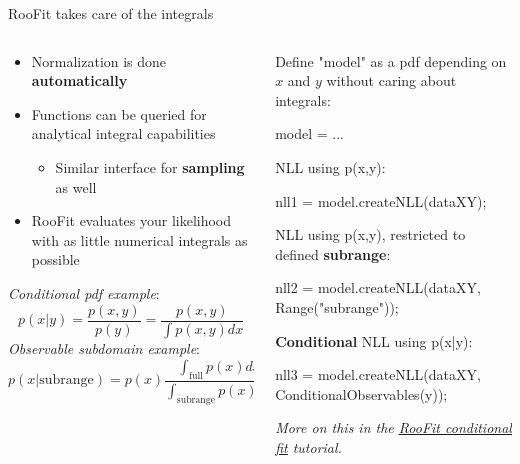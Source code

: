 \documentclass[aspectratio=169]{beamer}
\newcommand{\myhref}[2]{{\color{blue}\href{#1}{\underline{#2}}}}
\begin{document}
\begin{frame}[fragile]{RooFit takes care of the integrals}
  \begin{columns}
    \begin{column}{0.5\textwidth}
        \begin{itemize}
            \item Normalization is done \textbf{automatically}
            \item Functions can be queried for analytical integral capabilities
            \begin{itemize}
                \item Similar interface for \textbf{sampling} as well
            \end{itemize}
            \item RooFit evaluates your likelihood with as little numerical integrals as possible
        \end{itemize}
        \textit{Conditional pdf example}:
        $$ p(x|y) = \frac{p(x,y)}{p(y)} = \frac{p(x,y)}{\int p(x,y)dx} $$
        \textit{Observable subdomain example}:
        $$ p(x|\text{subrange}) = p(x)\frac{\int_\text{full} p(x)dx}{\int_\text{subrange} p(x)dx} $$
    \end{column}
    \begin{column}{0.5\textwidth}
Define "model" as a pdf depending on $x$ and $y$ without caring about integrals:
\begin{myterminaltiny}
model = ...
\end{myterminaltiny}

NLL using p(x,y):
\begin{myterminaltiny}
nll1 = model.createNLL(dataXY);
\end{myterminaltiny}

NLL using p(x,y), restricted to defined \textbf{subrange}:
\begin{myterminaltiny}
nll2 = model.createNLL(dataXY, Range("subrange"));
\end{myterminaltiny}

\textbf{Conditional} NLL using p(x|y):
\begin{myterminaltiny}
nll3 = model.createNLL(dataXY, ConditionalObservables(y));
\end{myterminaltiny}
        \textit{\footnotesize More on this in the \myhref{https://root.cern/doc/master/rf303__conditional_8C.html}{RooFit conditional fit} tutorial.}
    \end{column}
  \end{columns}
\end{frame}
\end{document}
